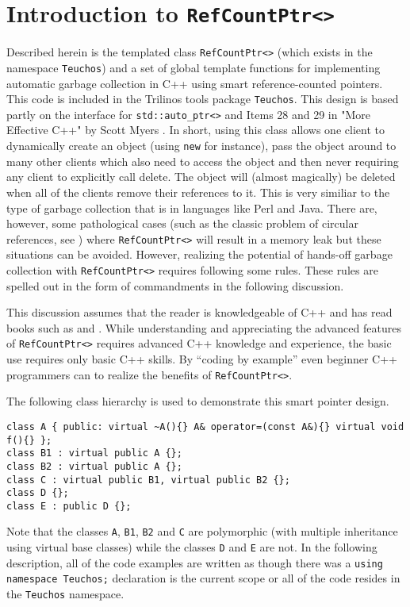 %
\section{Introduction to {}\texttt{RefCountPtr<>}}
%

Described herein is the templated class {}\texttt{RefCountPtr<>}
(which exists in the namespace {}\texttt{Teuchos}) and a set of global
template functions for implementing automatic garbage collection in
C++ using smart reference-counted pointers.  This code is included in
the Trilinos {}\cite{ref:Trilinos-Overview} tools package
{}\texttt{Teuchos}.  This design is based partly on the interface for
{}\texttt{std::auto\_ptr<>} and Items 28 and 29 in "More Effective
C++" by Scott Myers {}\cite{ref:meyers_1996}.  In short, using this
class allows one client to dynamically create an object (using
{}\texttt{new} for instance), pass the object around to many other
clients which also need to access the object and then never requiring
any client to explicitly call delete.  The object will (almost
magically) be deleted when all of the clients remove their references
to it.  This is very similiar to the type of garbage collection that
is in languages like Perl and Java.  There are, however, some
pathological cases (such as the classic problem of circular
references, see {}\cite[Item 29, page 212]{ref:meyers_1996}) where
{}\texttt{RefCountPtr<>} will result in a memory leak but these
situations can be avoided.  However, realizing the potential of
hands-off garbage collection with {}\texttt{RefCountPtr<>} requires
following some rules.  These rules are spelled out in the form of
commandments in the following discussion.

This discussion assumes that the reader is knowledgeable of C++ and
has read books such as {}\cite{ref:stroustrup_2000} and
{}\cite{ref:meyers_1994}.  While understanding and appreciating the
advanced features of {}\texttt{RefCountPtr<>} requires advanced C++
knowledge and experience, the basic use requires only basic C++
skills.  By ``coding by example'' even beginner C++ programmers can to
realize the benefits of {}\texttt{RefCountPtr<>}.

The following class hierarchy is used to demonstrate this smart
pointer design.
%
{\scriptsize\begin{verbatim}
class A { public: virtual ~A(){} A& operator=(const A&){} virtual void f(){} };
class B1 : virtual public A {};
class B2 : virtual public A {};
class C : virtual public B1, virtual public B2 {};
class D {};
class E : public D {};
\end{verbatim}}
%
Note that the classes {}\texttt{A}, {}\texttt{B1}, {}\texttt{B2} and
{}\texttt{C} are polymorphic (with multiple inheritance using virtual
base classes) while the classes {}\texttt{D} and {}\texttt{E} are not.
In the following description, all of the code examples are written as
though there was a {}\texttt{using namespace Teuchos;} declaration is
the current scope or all of the code resides in the {}\texttt{Teuchos}
namespace.

